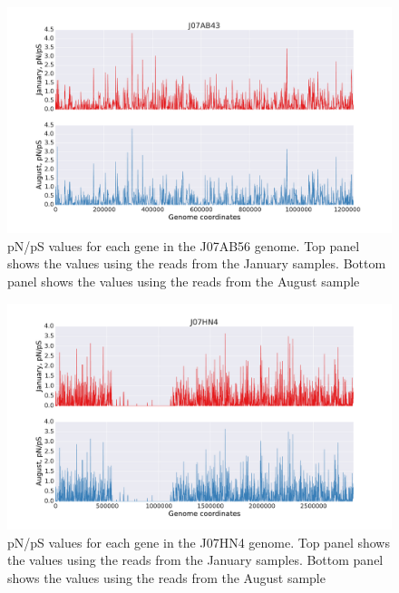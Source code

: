 \begin{figure}[p]
  \centering
  \includegraphics[width=\textwidth,height=\textheight,keepaspectratio]{Chapter5/Figures/pn_ps_plots/J07AB43_pNpS_density.pdf}
  \caption{pN/pS values for each gene in the J07AB56 genome. Top panel shows the values using the reads from the January samples. Bottom panel shows the values using the reads from the August sample}
  \label{J07AB43_pNpS}
\end{figure}

\begin{figure}[p]
  \centering
  \includegraphics[width=\textwidth,height=\textheight,keepaspectratio]{Chapter5/Figures/pn_ps_plots/J07HN4_pNpS_density.pdf}
  \caption{pN/pS values for each gene in the J07HN4 genome. Top panel shows the values using the reads from the January samples. Bottom panel shows the values using the reads from the August sample}
  \label{J07HN4_pNpS}
\end{figure}

